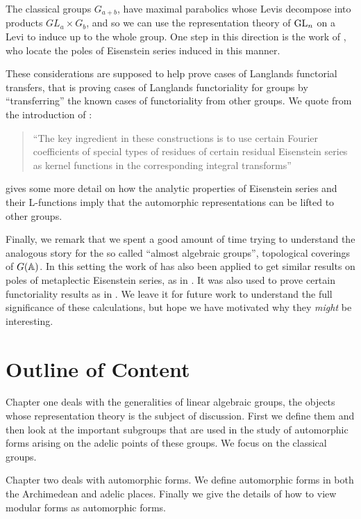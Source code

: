 The classical groups \(G_{a+b}\), have maximal parabolics whose Levis decompose into products \(GL_a\times G_{b}\), and so we can use the representation theory of \(\operatorname{GL}_n\) on a Levi to induce up to the whole group. One step in this direction is the work of \cite{jiangPolesCertainResidual2013}, who locate the poles of Eisenstein series induced in this manner. 

These considerations are supposed to help prove cases of Langlands functorial transfers, that is proving cases of Langlands functoriality for groups by ``transferring'' the known cases of functoriality from other groups. We quote from the introduction of \cite{jiangPolesCertainResidual2013}:

\begin{quote}
	``The key ingredient in these constructions is to use certain Fourier coefficients of special types of residues of certain residual Eisenstein series as kernel functions in the corresponding integral transforms''
\end{quote}
\cite{bumpRankinSelbergMethodIntroduction2011} gives some more detail on how the analytic properties of Eisenstein series and their L-functions imply that the automorphic representations can be lifted to other groups. 

Finally, we remark that we spent a good amount of time trying to understand the analogous story for the so called ``almost algebraic groups'', topological coverings of \(G(\A)\). In this setting the work of \cite{jiangPolesCertainResidual2013} has also been applied to get similar results on poles of metaplectic Eisenstein series, as in \cite{kaplanDoublingConstructionsComplete2021}. It was also used to prove certain functoriality results as in \cite{caiDoublingConstructionsGlobal2024}. We leave it for future work to understand the full significance of these calculations, but hope we have motivated why they \textit{might} be interesting.

\section*{Outline of Content}
Chapter one deals with the generalities of linear algebraic groups, the objects whose representation theory is the subject of discussion. First we define them and then look at the important subgroups that are used in the study of automorphic forms arising on the adelic points of these groups. We focus on the classical groups.

Chapter two deals with automorphic forms. We define automorphic forms in both the Archimedean and adelic places. Finally we give the details of how to view modular forms as automorphic forms. 


